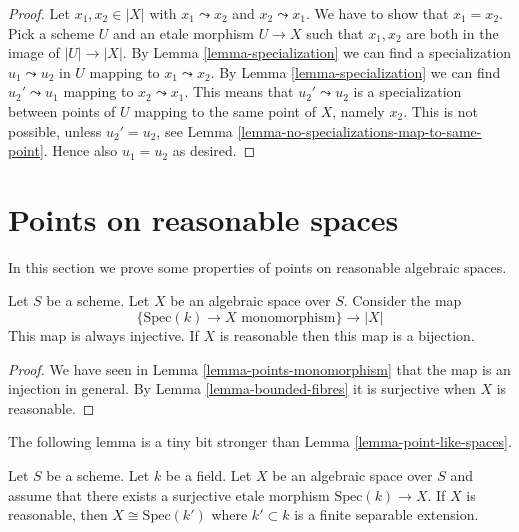 \begin{proof}
Let $x_1, x_2 \in |X|$ with $x_1 \leadsto x_2$ and $x_2 \leadsto x_1$.
We have to show that $x_1 = x_2$. Pick a scheme $U$ and an etale morphism
$U \to X$ such that $x_1, x_2$ are both in the image of $|U| \to |X|$.
By Lemma \ref{lemma-specialization} we can find a specialization
$u_1 \leadsto u_2$ in $U$ mapping to $x_1 \leadsto x_2$.
By Lemma \ref{lemma-specialization} we can find
$u_2' \leadsto u_1$ mapping to $x_2 \leadsto x_1$. This means that
$u_2' \leadsto u_2$ is a specialization between points of $U$ mapping to
the same point of $X$, namely $x_2$. This is not possible, unless
$u_2' = u_2$, see
Lemma \ref{lemma-no-specializations-map-to-same-point}. Hence
also $u_1 = u_2$ as desired.
\end{proof}





\section{Points on reasonable spaces}
\label{section-points-reasonable}

\noindent
In this section we prove some properties of points on
reasonable algebraic spaces.

\begin{lemma}
\label{lemma-reasonable-points-monomorphism}
Let $S$ be a scheme. Let $X$ be an algebraic space over $S$.
Consider the map
$$
\{\text{Spec}(k) \to X \text{ monomorphism}\}
\longrightarrow
|X|
$$
This map is always injective. If $X$ is reasonable then this map
is a bijection.
\end{lemma}

\begin{proof}
We have seen in Lemma \ref{lemma-points-monomorphism}
that the map is an injection in general.
By Lemma \ref{lemma-bounded-fibres} it is surjective when $X$ is reasonable.
\end{proof}

\noindent
The following lemma is a tiny bit stronger than
Lemma \ref{lemma-point-like-spaces}.

\begin{lemma}
\label{lemma-reasonable-point-like-spaces}
Let $S$ be a scheme. Let $k$ be a field.
Let $X$ be an algebraic space over $S$ and assume that there exists
a surjective etale morphism $\text{Spec}(k) \to X$.
If $X$ is reasonable, then $X \cong \text{Spec}(k')$
where $k' \subset k$ is a finite separable extension.
\end{lemma}

